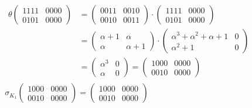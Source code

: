 \documentclass[fleqn]{article}
\begin{document}
\begin{equation*}
\begin{aligned}
            &\begin{aligned} 
                \theta 
                \begin{pmatrix}
                    1111 & 0000 \\
                    0101 & 0000
                \end{pmatrix} &=
                \begin{pmatrix}
                    0011 & 0010 \\
                    0010 & 0011
                \end{pmatrix} \cdot
                \begin{pmatrix}
                    1111 & 0000 \\
                    0101 & 0000
                \end{pmatrix} \\ &= 
                 \begin{pmatrix}
                    \alpha + 1 & \alpha \\
                    \alpha & \alpha + 1
                 \end{pmatrix} \cdot
                    \begin{pmatrix} 
                        \alpha^3 + \alpha^2 + \alpha + 1 & 0 \\
                        \alpha^2 + 1 & 0
                    \end{pmatrix} \\ &=
                    \begin{pmatrix}
                        \alpha^3 & 0 \\
                        \alpha   & 0
                    \end{pmatrix} = 
                    \begin{pmatrix}
                        1000 & 0000 \\
                        0010 & 0000
                    \end{pmatrix}
            \end{aligned} \\
            &\sigma_{K_1} \begin{pmatrix}
                1000 & 0000 \\
                0010 & 0000
            \end{pmatrix} =
            \begin{pmatrix}
                1000 & 0000 \\
                0010 & 0000

\end{pmatrix}
\end{aligned}
\end{equation*}
\end{document}
